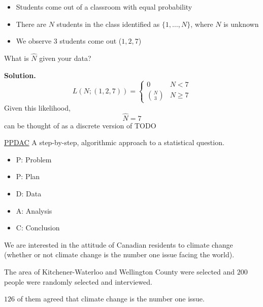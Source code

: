 \begin{Example}{}{}
    \begin{itemize}
        \item Students come out of a classroom with equal probability
        \item There are $ N $ students in the class identified as $ \{1,\ldots ,N\} $, where
              $ N $ is unknown
        \item We observe $ 3 $ students come out ($ 1,2,7 $)
    \end{itemize}
    What is $ \hat{N} $ given your data?

    \textbf{Solution.}
    \[ L(N;(1,2,7))=
        \begin{cases}
            0            & N<7          \\
            \binom{N}{3} & N\geqslant 7
        \end{cases} \]
    Given this likelihood,
    \[ \hat{N}=7 \]
    can be thought of as a discrete version of TODO
\end{Example}


\underline{PPDAC}
A step-by-step, algorithmic approach to a statistical question.
\begin{itemize}
    \item P\@: Problem
    \item P\@: Plan
    \item D\@: Data
    \item A\@: Analysis
    \item C\@: Conclusion
\end{itemize}

\begin{Example}{}{}
    We are interested in the attitude of Canadian residents to climate change
    (whether or not climate change is the number one issue facing the world).

    The area of Kitchener-Waterloo and Wellington County were selected
    and $ 200 $ people were randomly selected and interviewed.

    $ 126 $ of them agreed that climate change is the number one issue.
\end{Example}

